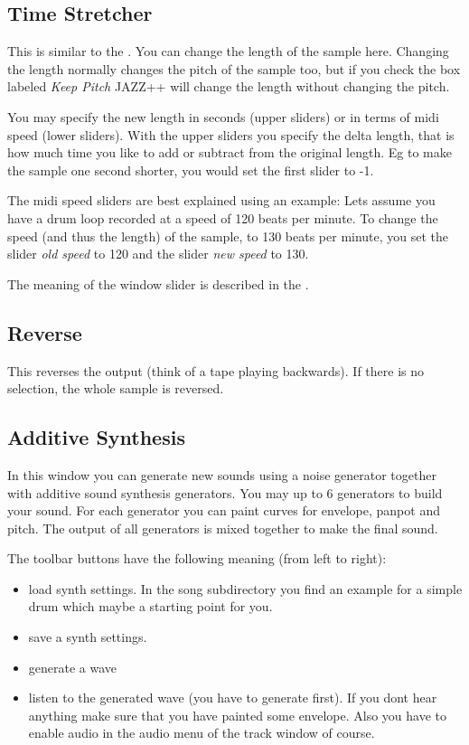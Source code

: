 \documentclass[letterpaper]{report}
\begin{document}
\subsection{Time Stretcher}

This is similar to the . You can
change the length of the sample here. Changing the length normally
changes the pitch of the sample too, but if you check the box labeled
{\em Keep Pitch} JAZZ++ will change the length without changing the pitch.

You may specify the new length in seconds (upper sliders) or in terms
of midi speed (lower sliders). With the upper sliders you specify the
delta length, that is how much time you like to add or subtract from
the original length. Eg to make the sample one second shorter, you
would set the first slider to -1.

The midi speed sliders are best explained using an example: Lets assume
you have a drum loop recorded at a speed of 120 beats per minute. To
change the speed (and thus the length) of the sample, to 130 beats per
minute, you set the slider {\em old speed} to 120 and the slider {\em new speed}
to 130.

The meaning of the window slider is described in the .



\subsection{Reverse}

This reverses the output (think of a tape playing backwards). If there
is no selection, the whole sample is reversed.



\subsection{Additive Synthesis}

In this window you can generate new sounds using a noise generator
together with additive sound synthesis generators. You may up to 6
generators to build your sound. For each generator you can paint curves
for envelope, panpot and pitch. The output of all generators is mixed
together to make the final sound.

The toolbar buttons have the following meaning (from left to right):
\begin{itemize}
\item load synth settings. In the song subdirectory you find an
example for a simple drum which maybe a starting point for you.
\item save a synth settings.
\item generate a wave
\item listen to the generated wave (you have to generate first). If you
dont hear anything make sure that you have painted some envelope. Also
you have to enable audio in the audio menu of the track window of course.
\end{itemize}
\end{document}
